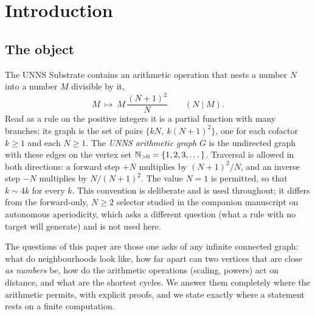 \tableofcontents
\newpage

\section{Introduction}\label{sec:intro}
\subsection{The object}
The UNNS Substrate contains an arithmetic operation that nests a number $N$ into a number $M$ divisible by it,
\[
M\ \longmapsto\ M\,\frac{(N+1)^2}{N}\qquad(N\mid M).
\]
Read as a rule on the positive integers it is a partial function with many branches; its graph is the set of pairs
$\{kN,\ k(N+1)^2\}$, one for each cofactor $k\ge1$ and each $N\ge1$.
The \emph{UNNS arithmetic graph} $G$ is the undirected graph with these edges on the vertex set $\mathbb{N}_{>0}=\{1,2,3,\dots\}$.
Traversal is allowed in both directions: a forward step $+N$ multiplies by $(N+1)^2/N$, and an inverse step $-N$ multiplies by $N/(N+1)^2$. The value $N=1$ is permitted, so that $k\sim4k$ for every $k$.
This convention is deliberate and is used throughout; it differs from the forward-only, $N\ge2$ selector studied in the companion manuscript on autonomous aperiodicity, which asks a different question (what a rule with no target will generate) and is not used here.

The questions of this paper are those one asks of any infinite connected graph: what do neighbourhoods look like, how far apart can two vertices that are close \emph{as numbers} be, how do the arithmetic operations (scaling, powers) act on distance, and what are the shortest cycles.
We answer them completely where the arithmetic permits, with explicit proofs, and we state exactly where a statement rests on a finite computation.

